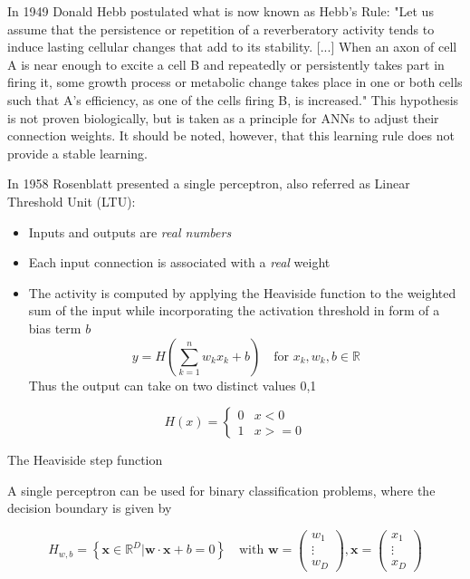 \documentclass[11pt]{article}
\begin{document}
In 1949 Donald Hebb postulated what is now known as Hebb's Rule:
"Let us assume that the persistence or repetition of a reverberatory activity tends to induce lasting cellular changes that add to its stability. [...] When an axon of cell A is near enough to excite a cell B and repeatedly or persistently takes part in firing it, some growth process or metabolic change takes place in one or both cells such that A's efficiency, as one of the cells firing B, is increased."
This hypothesis is not proven biologically, but is taken as a principle for ANNs to adjust their connection weights. It should be noted, however, that this learning rule does not provide a stable learning.

In 1958 Rosenblatt presented a single perceptron, also referred as Linear Threshold Unit (LTU):

\begin{itemize}
	\item Inputs and outputs are \emph{real numbers}
	\item Each input connection is associated with a \emph{real} weight
	\item The activity is computed by applying the Heaviside function to the weighted sum of the input while incorporating the activation threshold in form of a bias term $b$
	\begin{equation*}
		y = H\left(\sum_{k=1}^{n} w_k x_k + b \right)\quad\text{for } x_k,w_k,b\in\mathbb{R}
	\end{equation*}
	Thus the output can take on two distinct values {0,1}
\end{itemize}

\begin{equ}[H]
	\begin{equation*}
		H(x) = \left\{\begin{matrix}
			0 & x<0\\
			1 & x>=0
		\end{matrix}\right.
	\end{equation*}
	\caption{The Heaviside step function}
\end{equ}

A single perceptron can be used for binary classification problems, where the decision boundary is given by

\begin{equation*}
	H_{w,b} = \left\{ \textbf{x} \in \mathbb{R}^D | \textbf{w} \cdot \textbf{x} + b = 0 \right\}\quad\text{with }\textbf{w}=\begin{pmatrix}
		w_1\\
		\vdots\\
		w_D
	\end{pmatrix},
	\textbf{x} = \begin{pmatrix}
	x_1\\
	\vdots\\
	x_D
	\end{pmatrix}
\end{equation*}
\end{document}
